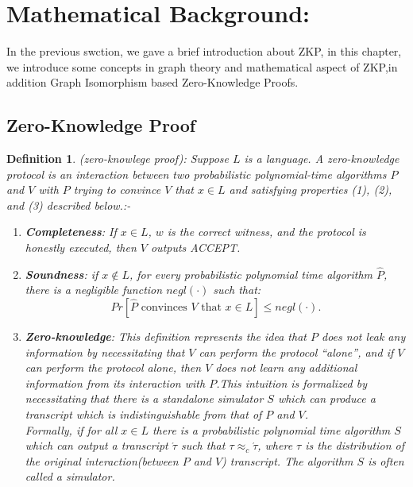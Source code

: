 \documentclass[12pt,a4paper]{article}
\newtheorem{defn}[thm]{Definition}
\begin{document}
\section{Mathematical Background:}
In the previous swction, we gave a brief  introduction about ZKP, in this chapter, we introduce some concepts in graph theory and mathematical aspect of ZKP,in addition Graph Isomorphism based Zero-Knowledge Proofs.\\
\subsection{Zero-Knowledge Proof}
\begin{defn}(zero-knowlege proof):\cite{lec-notes1:3}
Suppose $L$ is a language. A zero-knowledge protocol is an interaction between two probabilistic polynomial-time algorithms $P$ and $V$ with $P$ trying to convince $V$ that $x\in L$ and satisfying properties (1), (2), and (3) described below.:-

\begin{enumerate}	
\item
\begin{enumerate}
\textbf{Completeness}: If $x\in L$, $w$ is the correct witness, and the protocol is honestly executed, then $V$ outputs ACCEPT.
\end{enumerate}	
\item
\begin{enumerate}
\textbf{Soundness}: if $x\notin L$, for every probabilistic polynomial time algorithm $\hat{P}$, there is a negligible function $negl(\cdot)$ such that: 
$$Pr[\hat{P} \text{ convinces } V \text{ that } x\in L]\leq negl(\cdot).$$
\end{enumerate}	
\item
\begin{enumerate}
\textbf{Zero-knowledge}: This definition represents the idea that $P$ does not leak any information by necessitating that $V$ can perform the protocol “alone”, and if $V$ can perform the protocol alone, then $V$ does not learn any additional information from its interaction with $P$.This intuition is formalized by necessitating that there is a standalone simulator $S$ which can produce a transcript which is indistinguishable from that of $P$ and $V$.\\
Formally, if for all $x\in L$ there is a probabilistic polynomial time algorithm $S$ which can output a transcript $\acute{\tau}$ such that $\tau \approx_{c} \acute{\tau}$, where $\tau$ is the distribution of the original interaction(between $P$ and $V$) transcript. The algorithm $S$ is often called a simulator.
\end{enumerate}
\end{enumerate}
\end{defn}


\end{document}

